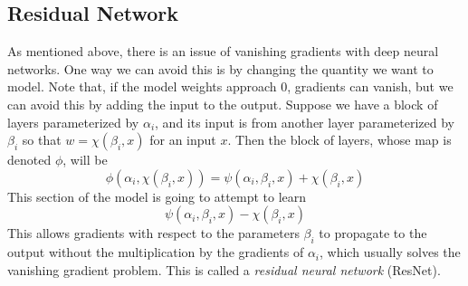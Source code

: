 \subsection{Residual Network}
As mentioned above, there is an issue of vanishing gradients with deep neural networks. One way we can avoid this is by changing the quantity we want to model. Note that, if the model weights approach 0, gradients can vanish, but we can avoid this by adding the input to the output. Suppose we have a block of layers parameterized by $\alpha_i$, and its input is from another layer parameterized by $\beta_i$ so that $w=\chi(\beta_i,x)$ for an input $x$. Then the block of layers, whose map is denoted $\phi$, will be
\begin{equation}
	\phi(\alpha_i,\chi(\beta_i,x)) = \psi(\alpha_i,\beta_i,x)+\chi(\beta_i,x)
\end{equation}
This section of the model is going to attempt to learn
\begin{equation}
	\psi(\alpha_i,\beta_i,x)-\chi(\beta_i,x)
\end{equation}
This allows gradients with respect to the parameters $\beta_i$ to propagate to the output without the multiplication by the gradients of $\alpha_i$, which usually solves the vanishing gradient problem. This is called a \textit{residual neural network} (ResNet).
